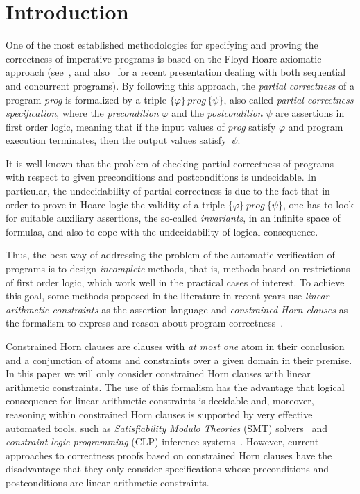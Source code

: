 \documentclass[english]{tlp}
\begin{document}
\section{Introduction}
\label{sec:intro}

One of the most established methodologies for specifying
and proving the correctness of imperative programs is based on the 
Floyd-Hoare axiomatic approach
(see~\cite{Hoa69}, and also~\cite{Ap&09} for a recent presentation dealing with 
both sequential and concurrent programs). 
By following this approach, the {\it partial correctness} of a program 
\textit{prog} is formalized by a triple
$\{\varphi\}\, \textit{prog}\, \{\psi\}$, also called {\it partial 
correctness specification}, 
where the {\it precondition} $\varphi$ and the
{\it postcondition} $\psi$ are assertions in
first order logic, meaning that
if the input values of \textit{prog} satisfy $\varphi$
and program execution terminates, then the output values satisfy~$\psi$.

It is well-known that the problem of checking
partial correctness of programs with respect to given 
preconditions and postconditions
is undecidable. 
In particular, the undecidability of partial correctness is due to the fact
that in order to prove in Hoare logic the validity of a 
triple $\{\varphi\}\ \textit{prog}\ \{\psi\}$, 
one has to look for suitable auxiliary assertions, 
the so-called {\it invariants}, in an infinite space of formulas, and also
to cope with the undecidability of logical consequence.

Thus, the best way of addressing the problem of the automatic verification of
programs is to design {\it incomplete} methods, that is, methods
based on restrictions of first order logic, which work well in the practical cases of interest.
To achieve this goal, some methods proposed in the literature
in recent years use 
{\it linear arithmetic constraints} as the assertion language and {\it constrained 
Horn clauses} as the formalism to express and reason about program 
correctness~\cite{Bj&12,De&14c,Gr&12,Ja&12,Pe&98,PoR07,Ru&13}.

Constrained Horn clauses are clauses with {\it at most one} atom in their conclusion and a conjunction of atoms
and constraints over a given domain in their premise. In this paper 
we will only consider constrained Horn clauses with linear arithmetic constraints.
The use of  this formalism has the advantage that logical consequence 
for linear arithmetic constraints is decidable and, moreover, 
reasoning within constrained Horn clauses is supported by very effective
automated tools, such as {\it Satisfiability Modulo Theories} (SMT)
solvers~\cite{DeB08,MaS13,Ru&13} and
{\it constraint logic programming} (CLP) inference systems~\cite{JaM94}.
However, current approaches to correctness proofs based on constrained Horn clauses 
have the disadvantage that they only consider specifications whose preconditions and  
postconditions are linear arithmetic constraints.
\end{document}
